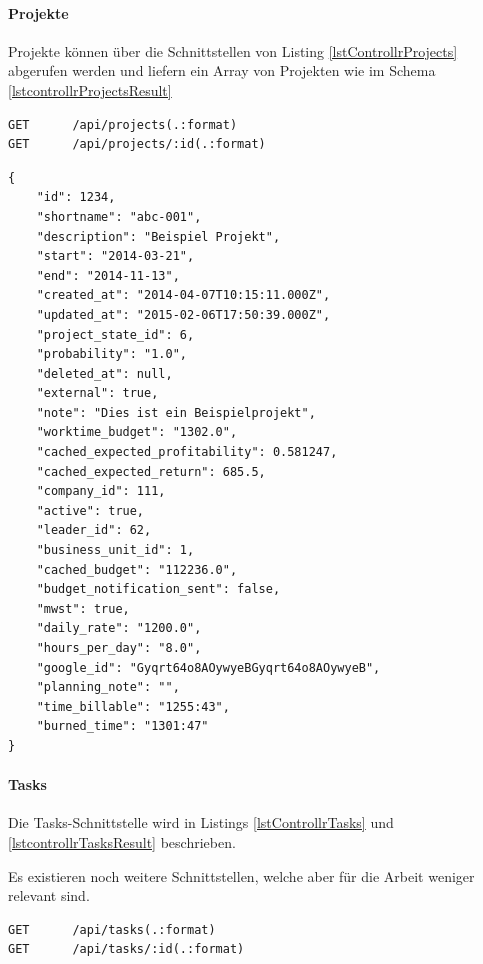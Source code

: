 \documentclass[]{article}
\begin{document}
\paragraph{Projekte}\label{projekte}

Projekte können über die Schnittstellen von Listing
\ref{lstControllrProjects} abgerufen werden und liefern ein Array von
Projekten wie im Schema \ref{lstcontrollrProjectsResult}

\begin{lstlisting}[caption=Controllr REST API für Projekte, label=lstControllrProjects]
GET      /api/projects(.:format)                         
GET      /api/projects/:id(.:format)   
\end{lstlisting}

\begin{lstlisting}[caption=Schema von /api/projects, label=lstcontrollrProjectsResult]
{
    "id": 1234,
    "shortname": "abc-001",
    "description": "Beispiel Projekt",
    "start": "2014-03-21",
    "end": "2014-11-13",
    "created_at": "2014-04-07T10:15:11.000Z",
    "updated_at": "2015-02-06T17:50:39.000Z",
    "project_state_id": 6,
    "probability": "1.0",
    "deleted_at": null,
    "external": true,
    "note": "Dies ist ein Beispielprojekt",
    "worktime_budget": "1302.0",
    "cached_expected_profitability": 0.581247,
    "cached_expected_return": 685.5,
    "company_id": 111,
    "active": true,
    "leader_id": 62,
    "business_unit_id": 1,
    "cached_budget": "112236.0",
    "budget_notification_sent": false,
    "mwst": true,
    "daily_rate": "1200.0",
    "hours_per_day": "8.0",
    "google_id": "Gyqrt64o8AOywyeBGyqrt64o8AOywyeB",
    "planning_note": "",
    "time_billable": "1255:43",
    "burned_time": "1301:47"
}
\end{lstlisting}

\paragraph{Tasks}\label{tasks}

Die Tasks-Schnittstelle wird in Listings \ref{lstControllrTasks} und
\ref{lstcontrollrTasksResult} beschrieben.

Es existieren noch weitere Schnittstellen, welche aber für die Arbeit
weniger relevant sind.

\begin{lstlisting}[caption=Controllr REST API für Tasks, label=lstControllrTasks]
GET      /api/tasks(.:format)                            
GET      /api/tasks/:id(.:format)   
\end{lstlisting}
\end{document}
